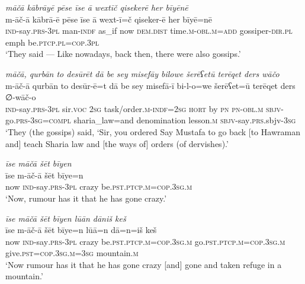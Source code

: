 \ea \label{ŽP.125}
\textit{māčā kābrāyē pēse īse ā wextīč qisekerē her bīyēnē} \\ 
\gll m-āč-ā kābrā-ē pēse īse ā wext-ī=č qiseker-ē her bīyē=nē \\ 
 \textsc{ind-}say\textsc{.prs}\textsc{-3pl} man\textsc{-indf} as\_if now \textsc{dem.dist} time\textsc{.m}\textsc{-obl}\textsc{.m}\textsc{=add} gossiper\textsc{-dir}\textsc{.pl} emph be\textsc{.ptcp}\textsc{.pl}\textsc{=cop}\textsc{.3pl} \\ 
\glt `They said — Like nowadays, back then, there were also gossips.'
\z 
 
\ea \label{ŽP.126}
\textit{māčā, qurbān to desūrēt dā be sey misefāy bilowe šerēʕetū terēqet ders wāčo} \\ 
\gll m-āč-ā qurbān to desūr-ē=t dā be sey misefā-ī bi-l-o=we šerēʕet=ū terēqet ders ∅-wāč-o \\ 
 \textsc{ind-}say\textsc{.prs}\textsc{-3pl} sir.\textsc{voc} \textsc{2sg} task/order\textsc{.m}\textsc{-indf}\textsc{=\textsc{2sg}} \textsc{hort} by \textsc{pn} \textsc{pn}\textsc{-obl}\textsc{.m} \textsc{sbjv-}go\textsc{.prs}\textsc{-3sg}\textsc{=compl} sharia\_law=and denomination lesson\textsc{.m} \textsc{sbjv-}say\textsc{.prs}.sbjv\textsc{-3sg} \\ 
\glt `They (the gossips) said, ‘Sir, you ordered Say Mustafa to go back [to Hawraman and] teach Sharia law and [the ways of] orders (of dervishes).'
\z 
 
\ea \label{ŽP.127}
\textit{īse māčā šēt bīyen} \\ 
\gll īse m-āč-ā šēt bīye=n \\ 
 now \textsc{ind-}say\textsc{.prs}\textsc{-3pl} crazy be\textsc{.pst}\textsc{.ptcp}\textsc{.m}\textsc{=cop}\textsc{.3sg}\textsc{.m} \\ 
\glt `Now, rumour has it that he has gone crazy.'
\z 
 
\ea \label{ŽP.128}
\textit{īse māčā šēt bīyen lūān dāniš keš} \\ 
\gll īse m-āč-ā šēt bīye=n lūā=n dā=n=iš keš \\ 
 now \textsc{ind-}say\textsc{.prs}\textsc{-3pl} crazy be\textsc{.pst}\textsc{.ptcp}\textsc{.m}\textsc{=cop}\textsc{.3sg}\textsc{.m} go\textsc{.pst}\textsc{.ptcp}\textsc{.m}\textsc{=cop}\textsc{.3sg}\textsc{.m} give\textsc{.pst}\textsc{=cop}\textsc{.3sg}\textsc{.m}\textsc{=3sg} mountain\textsc{.m} \\ 
\glt `Now rumour has it that he has gone crazy [and] gone and taken refuge in a mountain.'
\z 
 

